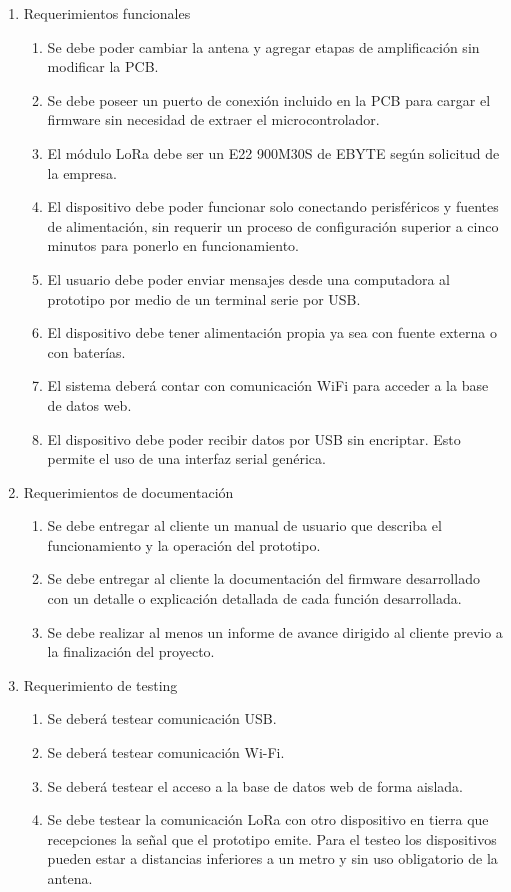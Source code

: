 \documentclass[
11pt, %
codirector, %
]{charter}
\begin{document}
\begin{enumerate}
	\item Requerimientos funcionales
		\begin{enumerate}
			\item Se debe poder cambiar la antena y agregar etapas de amplificación sin modificar la PCB.
			\item Se debe poseer un puerto de conexión incluido en la PCB para cargar el firmware sin necesidad de extraer el microcontrolador.
			\item El módulo LoRa debe ser un E22 900M30S de EBYTE según solicitud de la empresa.
			\item El dispositivo debe poder funcionar solo conectando perisféricos y fuentes de alimentación, sin requerir un proceso de configuración superior a cinco minutos para ponerlo en funcionamiento.
			\item El usuario debe poder enviar mensajes desde una computadora al prototipo por medio de un terminal serie por USB.
			\item El dispositivo debe tener alimentación propia ya sea con fuente externa o con baterías.
			\item El sistema deberá contar con comunicación WiFi para acceder a la base de datos web.
			\item El dispositivo debe poder recibir datos por USB sin encriptar. Esto permite el uso de una interfaz serial genérica.
		\end{enumerate}
	\item Requerimientos de documentación
		\begin{enumerate}
			\item Se debe entregar al cliente un manual de usuario que describa el funcionamiento y la operación del prototipo.
			\item Se debe entregar al cliente la documentación del firmware desarrollado con un detalle o  explicación detallada de cada función desarrollada.
			\item Se debe realizar al menos un informe de avance dirigido al cliente previo a la finalización del proyecto.
		\end{enumerate}
	\item Requerimiento de testing
		\begin{enumerate}
			\item Se deberá testear comunicación USB.
			\item Se deberá testear comunicación Wi-Fi.
			\item Se deberá testear el acceso a la base de datos web de forma aislada.
			\item Se debe testear la comunicación LoRa con otro dispositivo en tierra que recepciones la señal que el prototipo emite. Para el testeo los dispositivos pueden estar a distancias inferiores a un metro y sin uso obligatorio de la antena.
		\end{enumerate}
\end{enumerate}
\end{document}
